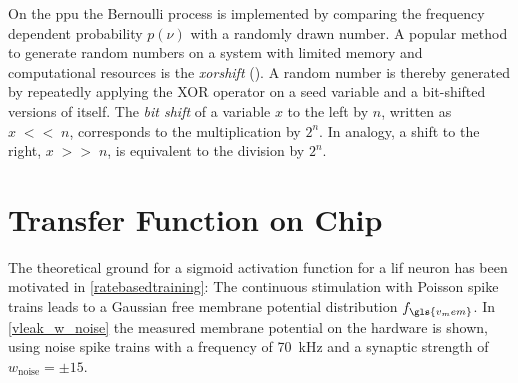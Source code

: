 On the \gls{ppu} the Bernoulli process is implemented by comparing the frequency dependent probability $p(\nu)$ with a randomly drawn number. A popular method to generate random numbers on a system with limited memory and computational resources is the \emph{xorshift} (\citealp{marsaglia2003xorshift}). A random number is thereby generated by repeatedly applying the XOR operator on a seed variable and a bit-shifted versions of itself. The \emph{bit shift} of a variable $x$ to the left by $n$, written as $x\;{\scriptstyle<<}\;n$, corresponds to the multiplication by $2^n$. In analogy, a shift to the right, $x\;{\scriptstyle>>}\;n$, is equivalent to the division by $2^n$. 



\section{Transfer Function on Chip}
The theoretical ground for a sigmoid activation function for a \gls{lif} neuron has been motivated in \cref{ratebasedtraining}: The continuous stimulation with Poisson spike trains leads to a Gaussian free membrane potential distribution $f_{\gls{v_mem}}$. In \cref{vleak_w_noise} the measured membrane potential on the hardware is shown, using noise spike trains with a frequency of \SI{70}{\kilo \Hz} and a synaptic strength of $w_\text{noise}= \pm 15$.

